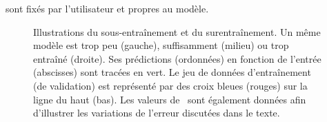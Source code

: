 sont fixés par l'utilisateur et propres au modèle.
\begin{figure}[h]
\centering

\caption[Illustrations du sous-entraînement et du surentraînement.]{Illustrations du sous-entraînement et du surentraînement.
Un même modèle est trop peu (gauche), suffisamment (milieu) ou trop entraîné (droite). Ses prédictions (ordonnées) en fonction de l'entrée (abscisses) sont tracées en vert.
Le jeu de données d'entraînement (de validation) est représenté par des croix bleues (rouges) sur la ligne du haut (bas).
Les valeurs de \LossMSE\ sont également données afin d'illustrer les variations de l'erreur discutées dans le texte.}
\label{fig-underfitting_and_overfitting}
\end{figure}